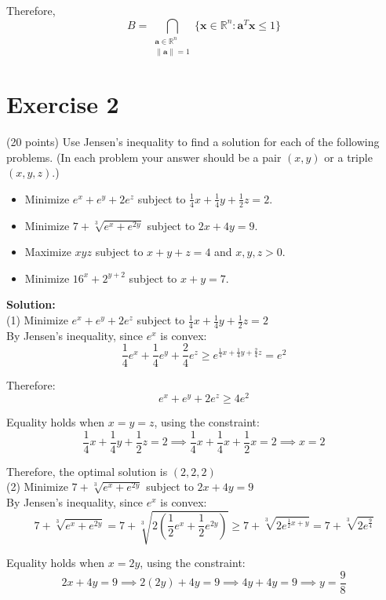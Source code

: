 \documentclass{article}
\begin{document}
Therefore,
\[
    B = \bigcap_{\substack{\mathbf{a}\in\mathbb{R}^n \\ \|\mathbf{a}\|=1}} \{\mathbf{x} \in \mathbb{R}^n : \mathbf{a}^T\mathbf{x} \leq 1\}
\]

\newpage

\section*{Exercise 2}
(20 points) Use Jensen's inequality to find a solution for each of the following problems. (In each problem your answer should be a pair $(x,y)$ or a triple $(x,y,z)$.)
\begin{itemize}
\item Minimize $e^x + e^y + 2e^z$ subject to $\frac{1}{4}x + \frac{1}{4}y + \frac{1}{2}z = 2$.
\item Minimize $7 + \sqrt[3]{e^x + e^{2y}}$ subject to $2x + 4y = 9$.
\item Maximize $xyz$ subject to $x + y + z = 4$ and $x,y,z > 0$.
\item Minimize $16^x + 2^{y+2}$ subject to $x + y = 7$.
\end{itemize}

\textbf{Solution:} \\

(1) Minimize $e^x + e^y + 2e^z$ subject to $\frac{1}{4}x + \frac{1}{4}y + \frac{1}{2}z = 2$ \\

By Jensen's inequality, since $e^x$ is convex:
\[
    \frac{1}{4}e^x + \frac{1}{4}e^y + \frac{2}{4}e^z \geq e^{\frac{1}{4}x + \frac{1}{4}y + \frac{2}{4}z} = e^2
\]

Therefore:
\[
    e^x + e^y + 2e^z \geq 4e^2
\]

Equality holds when $x = y = z$, using the constraint:
\[
    \frac{1}{4}x + \frac{1}{4}y + \frac{1}{2}z = 2 \implies \frac{1}{4}x + \frac{1}{4}x + \frac{1}{2}x = 2 \implies x = 2
\]

Therefore, the optimal solution is $(2,2,2)$ \\

(2) Minimize $7 + \sqrt[3]{e^x + e^{2y}}$ subject to $2x + 4y = 9$ \\

By Jensen's inequality, since $e^x$ is convex:
\[
    7 + \sqrt[3]{e^x + e^{2y}} = 7 + \sqrt[3]{2(\frac{1}{2}e^x + \frac{1}{2}e^{2y})} \geq 7 + \sqrt[3]{2e^{\frac{1}{2}x + y}} = 7 + \sqrt[3]{2e^{\frac{9}{4}}}
\]

Equality holds when $x = 2y$, using the constraint:
\[
    2x + 4y = 9 \implies 2(2y) + 4y = 9 \implies 4y + 4y = 9 \implies y = \frac{9}{8}
\]
\end{document}
